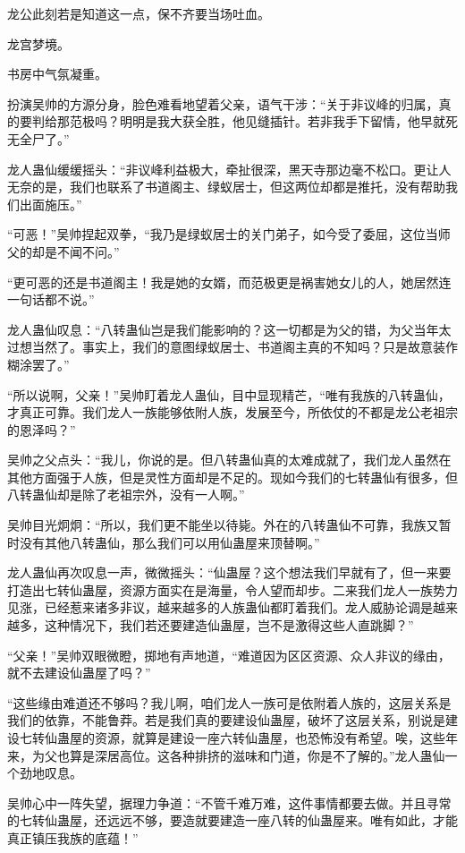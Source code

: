 \begin{this_body}
龙公此刻若是知道这一点，保不齐要当场吐血。

龙宫梦境。

书房中气氛凝重。

扮演吴帅的方源分身，脸色难看地望着父亲，语气干涉：“关于非议峰的归属，真的要判给那范极吗？明明是我大获全胜，他见缝插针。若非我手下留情，他早就死无全尸了。”

龙人蛊仙缓缓摇头：“非议峰利益极大，牵扯很深，黑天寺那边毫不松口。更让人无奈的是，我们也联系了书道阁主、绿蚁居士，但这两位却都是推托，没有帮助我们出面施压。”

“可恶！”吴帅捏起双拳，“我乃是绿蚁居士的关门弟子，如今受了委屈，这位当师父的却是不闻不问。”

“更可恶的还是书道阁主！我是她的女婿，而范极更是祸害她女儿的人，她居然连一句话都不说。”

龙人蛊仙叹息：“八转蛊仙岂是我们能影响的？这一切都是为父的错，为父当年太过想当然了。事实上，我们的意图绿蚁居士、书道阁主真的不知吗？只是故意装作糊涂罢了。”

“所以说啊，父亲！”吴帅盯着龙人蛊仙，目中显现精芒，“唯有我族的八转蛊仙，才真正可靠。我们龙人一族能够依附人族，发展至今，所依仗的不都是龙公老祖宗的恩泽吗？”

吴帅之父点头：“我儿，你说的是。但八转蛊仙真的太难成就了，我们龙人虽然在其他方面强于人族，但是灵性方面却是不足的。现如今我们的七转蛊仙有很多，但八转蛊仙却是除了老祖宗外，没有一人啊。”

吴帅目光炯炯：“所以，我们更不能坐以待毙。外在的八转蛊仙不可靠，我族又暂时没有其他八转蛊仙，那么我们可以用仙蛊屋来顶替啊。”

龙人蛊仙再次叹息一声，微微摇头：“仙蛊屋？这个想法我们早就有了，但一来要打造出七转仙蛊屋，资源方面实在是海量，令人望而却步。二来我们龙人一族势力见涨，已经惹来诸多非议，越来越多的人族蛊仙都盯着我们。龙人威胁论调是越来越多，这种情况下，我们若还要建造仙蛊屋，岂不是激得这些人直跳脚？”

“父亲！”吴帅双眼微瞪，掷地有声地道，“难道因为区区资源、众人非议的缘由，就不去建设仙蛊屋了吗？”

“这些缘由难道还不够吗？我儿啊，咱们龙人一族可是依附着人族的，这层关系是我们的依靠，不能鲁莽。若是我们真的要建设仙蛊屋，破坏了这层关系，别说是建设七转仙蛊屋的资源，就算是建设一座六转仙蛊屋，也恐怖没有希望。唉，这些年来，为父也算是深居高位。这各种排挤的滋味和门道，你是不了解的。”龙人蛊仙一个劲地叹息。

吴帅心中一阵失望，据理力争道：“不管千难万难，这件事情都要去做。并且寻常的七转仙蛊屋，还远远不够，要造就要建造一座八转的仙蛊屋来。唯有如此，才能真正镇压我族的底蕴！”


\end{this_body}
